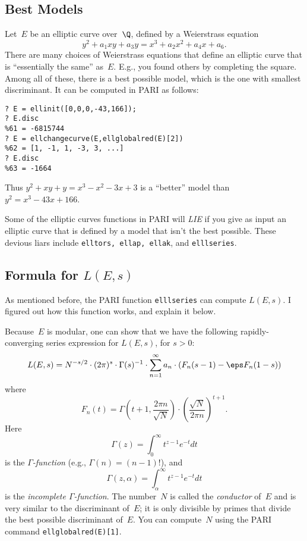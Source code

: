 \documentclass[11pt]{report}
\begin{document}
\subsection{Best Models}
Let~$E$ be an elliptic curve over~$\Q$, defined by
a Weierstrass equation
$$
  y^2 + a_1 xy + a_3 y = x^3 + a_2 x^2 + a_4 x + a_6.
$$
There are many choices of Weierstrass equations that
define an elliptic curve that is ``essentially the same''
as~$E$.  E.g., you found others by completing the square.
Among all of these, there is a best possible model, which
is the one with smallest discriminant.  It can be computed
in PARI as follows:
\begin{verbatim}
? E = ellinit([0,0,0,-43,166]);
? E.disc
%61 = -6815744
? E = ellchangecurve(E,ellglobalred(E)[2])
%62 = [1, -1, 1, -3, 3, ...]
? E.disc
%63 = -1664
\end{verbatim}
Thus $y^2 + xy +y = x^3 -x^2 -3x +3$ is a ``better''
model than $y^2 = x^3 - 43x + 166$.

 Some of the elliptic curves functions in PARI will {\em
    LIE} if you give as input an elliptic curve that is defined by a model
that isn't the best possible.  These devious liars include
  {\tt elltors, ellap, ellak}, and {\tt elllseries}.

\subsection{Formula for $L(E,s)$}
As mentioned before, the PARI function {\tt elllseries}
can compute $L(E,s)$.   I figured out how this function works, and
explain it below.

Because~$E$ is modular, one can show that we have the following
rapidly-converging series expression for $L(E,s)$, for $s>0$:
$$
  L(E,s) = N^{-s/2}\cdot (2\pi)^s\cdot  \Gamma(s)^{-1}\cdot
  \sum_{n=1}^{\infty} a_n \cdot \left(F_n(s-1) - \eps F_n(1-s)\right)
$$
where
$$
  F_n(t) =
  \Gamma\left(t+1, \frac{2\pi n}{\sqrt{N}}\right)
  \cdot \left(\frac{\sqrt{N}}{2\pi n}\right)^{t+1}.
$$
Here
$$
  \Gamma(z) = \int_{0}^{\infty} t^{z-1} e^{-t} dt
$$
is the {\em $\Gamma$-function} (e.g., $\Gamma(n) = (n-1)!$),
and
$$
  \Gamma(z,\alpha) = \int_{\alpha}^{\infty} t^{z-1} e^{-t}dt
$$
is the {\em incomplete $\Gamma$-function}.
The number~$N$ is called the {\em conductor} of~$E$ and is
very similar to the discriminant of~$E$; it is only divisible
by primes that divide the best possible discriminant of~$E$.
You can compute~$N$ using the PARI command {\tt ellglobalred(E)[1]}.
\end{document}

